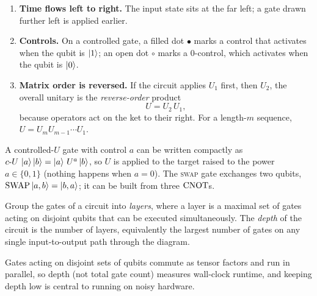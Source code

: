 \begin{enumerate}[label=(\arabic*)]
  \item \textbf{Time flows left to right.} The input state sits at the far left;
        a gate drawn further left is applied earlier.
  \item \textbf{Controls.} On a controlled gate, a filled dot $\bullet$ marks a
        control that activates when the qubit is $\ket{1}$; an open dot
        $\circ$ marks a $0$-control, which activates when the qubit is $\ket{0}$.
  \item \textbf{Matrix order is reversed.} If the circuit applies $U_{1}$ first,
        then $U_{2}$, the overall unitary is the \emph{reverse-order} product
        \[
          U = U_{2}\,U_{1},
        \]
        because operators act on the ket to their right. For a length-$m$
        sequence, $U=U_{m}U_{m-1}\cdots U_{1}$.
\end{enumerate}

A controlled-$U$ gate with control $a$ can be written compactly as
$c\text{-}U\,\ket{a}\ket{b}=\ket{a}\,U^{a}\ket{b}$, so $U$ is applied to the
target raised to the power $a\in\{0,1\}$ (nothing happens when $a=0$). The
\textsc{swap} gate exchanges two qubits, $\mathrm{SWAP}\ket{a,b}=\ket{b,a}$; it
can be built from three $\mathrm{CNOT}$s.

\begin{definition}
Group the gates of a circuit into \emph{layers}, where a layer is a maximal set
of gates acting on disjoint qubits that can be executed simultaneously. The
\emph{depth} of the circuit is the number of layers, equivalently the largest
number of gates on any single input-to-output path through the diagram.
\end{definition}

Gates acting on disjoint sets of qubits commute as tensor factors and run in
parallel, so depth (not total gate count) measures wall-clock runtime, and
keeping depth low is central to running on noisy hardware.


